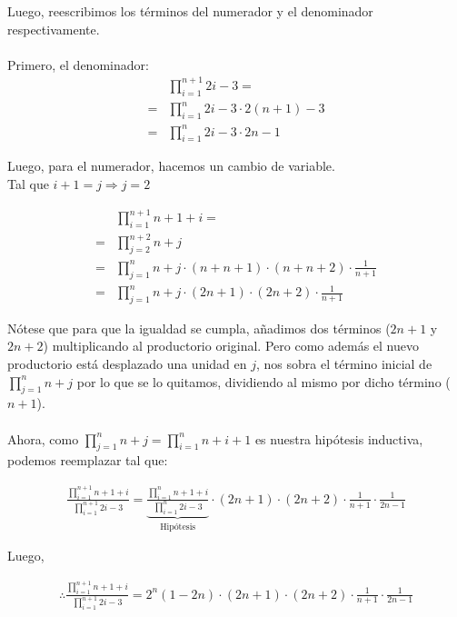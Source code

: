 \documentclass{article}
\begin{document}
\newpage

Luego, reescribimos los términos del numerador y el denominador respectivamente. 
\\\\
Primero, el denominador:
\begin{align*}
      &\prod_{i=1}^{n+1}2i-3 =            \\
    = &\prod_{i=1}^{n}2i-3 \cdot 2(n+1)-3 \\ 
    = &\prod_{i=1}^{n}2i-3 \cdot 2n-1
\end{align*}

Luego, para el numerador, hacemos un cambio de variable.\\Tal que $i+1 = j \Rightarrow j = 2$

\begin{align*}
      &\prod_{i=1}^{n+1}n+1+i =                                           \\
    = &\prod_{j=2}^{n+2}n+j                                               \\ 
    = &\prod_{j=1}^{n}n+j \cdot (n+n+1) \cdot (n+n+2) \cdot \frac{1}{n+1} \\
    = &\prod_{j=1}^{n}n+j \cdot (2n+1) \cdot (2n+2) \cdot \frac{1}{n+1}
\end{align*}

Nótese que para que la igualdad se cumpla, añadimos dos términos ($2n+1$ y $2n+2$) multiplicando al productorio original. Pero como además el nuevo productorio está desplazado una unidad en $j$, nos sobra el término inicial de $\prod_{j=1}^{n} n+j$ por lo que se lo quitamos, dividiendo al mismo por dicho término ($n+1$).
\\\\
Ahora, como $\prod_{j=1}^{n} n+j = \prod_{i=1}^{n} n+i+1$ es nuestra hipótesis inductiva, podemos reemplazar tal que:

\begin{align*}
     \frac{\prod_{i=1}^{n+1}n+1+i}{\prod_{i=1}^{n+1}2i-3} =
     \underbrace{\frac{\prod_{i=1}^{n}n+1+i}{\prod_{i=1}^{n}2i-3}}_{\textrm{Hipótesis}}
     \cdot (2n+1) \cdot (2n+2) \cdot \frac{1}{n+1} \cdot \frac{1}{2n-1}
\end{align*}

Luego,

\begin{align*}
     \therefore \frac{\prod_{i=1}^{n+1}n+1+i}{\prod_{i=1}^{n+1}2i-3} = 2^{n}(1-2n)
     \cdot (2n+1) \cdot (2n+2) \cdot \frac{1}{n+1} \cdot \frac{1}{2n-1}
\end{align*}
\end{document}
